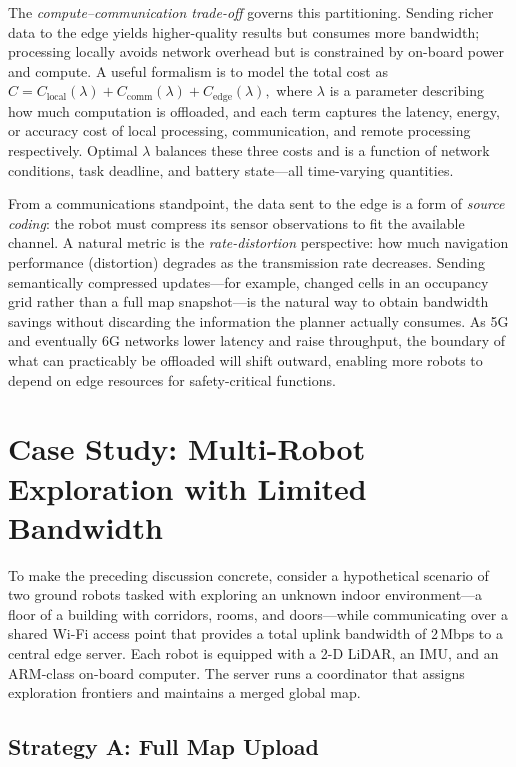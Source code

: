 The \emph{compute--communication trade-off} governs this partitioning.
Sending richer data to the edge yields higher-quality results but consumes more
bandwidth; processing locally avoids network overhead but is constrained by on-board
power and compute.
A useful formalism is to model the total cost as
\(
  C = C_{\text{local}}(\lambda) + C_{\text{comm}}(\lambda) + C_{\text{edge}}(\lambda),
\)
where \(\lambda\) is a parameter describing how much computation is offloaded, and
each term captures the latency, energy, or accuracy cost of local processing,
communication, and remote processing respectively.
Optimal \(\lambda\) balances these three costs and is a function of network conditions,
task deadline, and battery state---all time-varying quantities.

From a communications standpoint, the data sent to the edge is a form of \emph{source
coding}: the robot must compress its sensor observations to fit the available channel.
A natural metric is the \emph{rate-distortion} perspective: how much navigation
performance (distortion) degrades as the transmission rate decreases.
Sending semantically compressed updates---for example, changed cells in an occupancy
grid rather than a full map snapshot---is the natural way to obtain bandwidth savings
without discarding the information the planner actually consumes.
As 5G and eventually 6G networks lower latency and raise throughput, the boundary of
what can practicably be offloaded will shift outward, enabling more robots to depend on
edge resources for safety-critical functions.

\section{Case Study: Multi-Robot Exploration with Limited Bandwidth}

To make the preceding discussion concrete, consider a hypothetical scenario of two
ground robots tasked with exploring an unknown indoor environment---a floor of a
building with corridors, rooms, and doors---while communicating over a shared Wi-Fi
access point that provides a total uplink bandwidth of 2\,Mbps to a central edge server.
Each robot is equipped with a 2-D LiDAR, an IMU, and an ARM-class on-board computer.
The server runs a coordinator that assigns exploration frontiers and maintains a merged
global map.

\subsection*{Strategy A: Full Map Upload}

